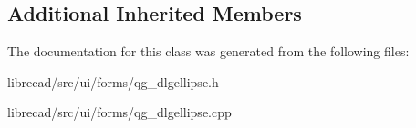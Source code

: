 \subsection*{Additional Inherited Members}


The documentation for this class was generated from the following files\-:\begin{DoxyCompactItemize}
\item 
librecad/src/ui/forms/qg\-\_\-dlgellipse.\-h\item 
librecad/src/ui/forms/qg\-\_\-dlgellipse.\-cpp\end{DoxyCompactItemize}
